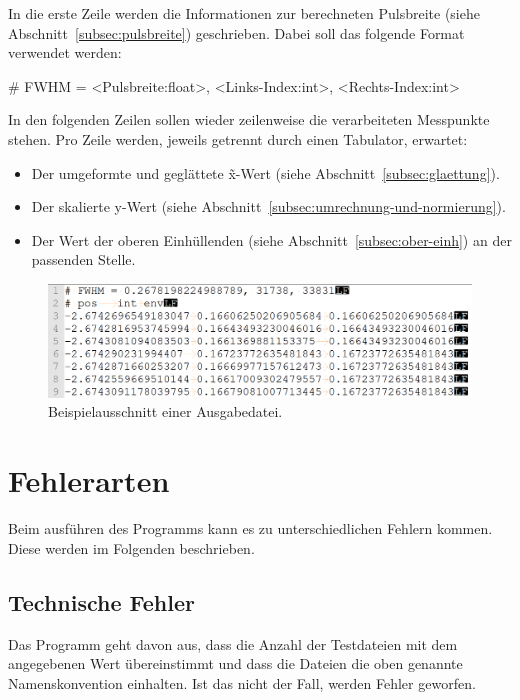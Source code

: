 In die erste Zeile werden die Informationen zur berechneten Pulsbreite (siehe Abschnitt~\ref{subsec:pulsbreite}) geschrieben.
Dabei soll das folgende Format verwendet werden:
\begin{center}
    \# FWHM = <Pulsbreite:float>, <Links-Index:int>, <Rechts-Index:int>
\end{center}
In den folgenden Zeilen sollen wieder zeilenweise die verarbeiteten Messpunkte stehen.
Pro Zeile werden, jeweils getrennt durch einen Tabulator, erwartet:
\begin{itemize}[noitemsep]
    \item Der umgeformte und geglättete \~x-Wert (siehe Abschnitt~\ref{subsec:glaettung}).
    \item Der skalierte y-Wert (siehe Abschnitt~\ref{subsec:umrechnung-und-normierung}).
    \item Der Wert der oberen Einhüllenden (siehe Abschnitt~\ref{subsec:ober-einh}) an der passenden Stelle.
\end{itemize}

\begin{figure}[htb]
    \centering
    \includegraphics[width=\linewidth]{images/ausgabeDat_bsp}
    \caption{
        Beispielausschnitt einer Ausgabedatei.
    }
    \label{fig:ausgabe_dat_beispiel}
\end{figure}

\section{Fehlerarten}\label{sec:fehlerarten}
Beim ausführen des Programms kann es zu unterschiedlichen Fehlern kommen.
Diese werden im Folgenden beschrieben.

\subsection{Technische Fehler}\label{subsec:technische-fehler}
Das Programm geht davon aus, dass die Anzahl der Testdateien mit dem angegebenen Wert übereinstimmt und dass die Dateien die oben genannte Namenskonvention einhalten.
Ist das nicht der Fall, werden Fehler geworfen.

